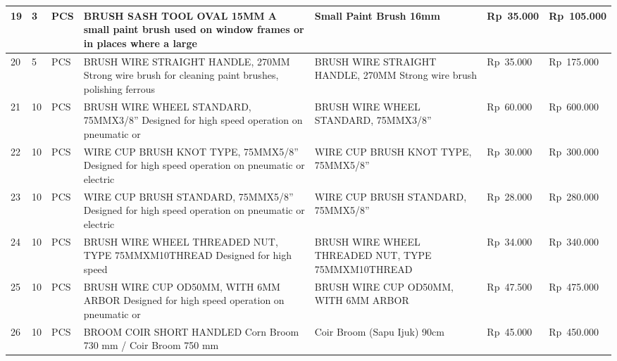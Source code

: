 \documentclass[9pt,a4paper,landscape]{article}
\begin{document}
\begin{longtable}{|C{0.6cm}|C{0.6cm}|C{0.8cm}|L{8.0cm}|L{9.5cm}|R{2.5cm}|R{2.5cm}|}
19 & 3 & PCS &
  BRUSH SASH TOOL OVAL 15MM\newline
  A small paint brush used on window frames or in\newline
  places where a large &
  Small Paint Brush 16mm &
  Rp~35.000 & Rp~105.000 \\
\hline

20 & 5 & PCS &
  BRUSH WIRE STRAIGHT HANDLE, 270MM\newline
  Strong wire brush for cleaning paint brushes,\newline
  polishing ferrous &
  BRUSH WIRE STRAIGHT HANDLE, 270MM Strong wire brush &
  Rp~35.000 & Rp~175.000 \\
\hline

21 & 10 & PCS &
  BRUSH WIRE WHEEL STANDARD, 75MMX3/8''\newline
  Designed for high speed operation on pneumatic or &
  BRUSH WIRE WHEEL STANDARD, 75MMX3/8'' &
  Rp~60.000 & Rp~600.000 \\
\hline

22 & 10 & PCS &
  WIRE CUP BRUSH KNOT TYPE, 75MMX5/8''\newline
  Designed for high speed operation on pneumatic or electric &
  WIRE CUP BRUSH KNOT TYPE, 75MMX5/8'' &
  Rp~30.000 & Rp~300.000 \\
\hline

23 & 10 & PCS &
  WIRE CUP BRUSH STANDARD, 75MMX5/8''\newline
  Designed for high speed operation on pneumatic or electric &
  WIRE CUP BRUSH STANDARD, 75MMX5/8'' &
  Rp~28.000 & Rp~280.000 \\
\hline

24 & 10 & PCS &
  BRUSH WIRE WHEEL THREADED NUT, TYPE\newline
  75MMXM10THREAD Designed for high speed &
  BRUSH WIRE WHEEL THREADED NUT, TYPE 75MMXM10THREAD &
  Rp~34.000 & Rp~340.000 \\
\hline

25 & 10 & PCS &
  BRUSH WIRE CUP OD50MM, WITH 6MM ARBOR\newline
  Designed for high speed operation on pneumatic or &
  BRUSH WIRE CUP OD50MM, WITH 6MM ARBOR &
  Rp~47.500 & Rp~475.000 \\
\hline

26 & 10 & PCS &
  BROOM COIR SHORT HANDLED\newline
  Corn Broom 730 mm / Coir Broom 750 mm &
  Coir Broom (Sapu Ijuk) 90cm &
  Rp~45.000 & Rp~450.000 \\
\hline


\end{longtable}
\end{document}
